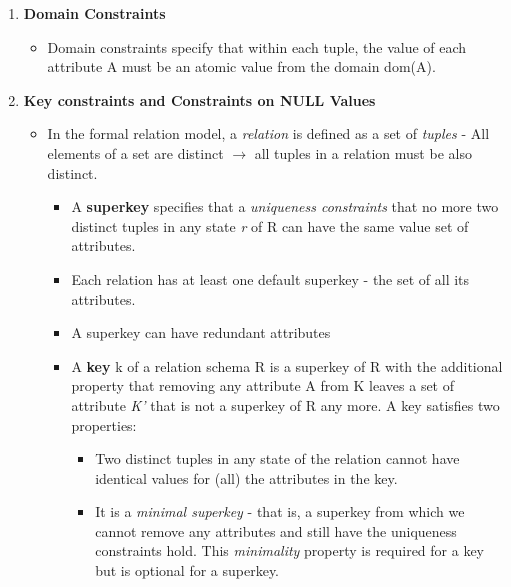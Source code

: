 \documentclass[10pt]{article}
\newcommand{\tf}{\textbf}
\newcommand{\ti}{\textit}
\begin{document}
\begin{enumerate}
	\item \tf{Domain Constraints}
	\begin{itemize}
		\item Domain constraints specify that within each tuple, the value of each attribute A must be an atomic value from the domain dom(A).
	\end{itemize}

	\item \tf{Key constraints and Constraints on NULL Values}
	\begin{itemize}
		\item In the formal relation model, a \ti{relation} is defined as a set of \ti{tuples} - All elements of a set are distinct $\rightarrow$ all tuples in a relation must be also distinct.
		\begin{itemize}
			\item A \tf{superkey} specifies that a \ti{uniqueness constraints} that no more two distinct tuples in any state \ti{r} of R can have the same value set of attributes.
			\item Each relation has at least one default superkey - the set of all its attributes.
			\item A superkey can have redundant attributes
			\item A \tf{key} k of a relation schema R is a superkey of R with the additional property that removing any attribute A from K leaves a set of attribute \ti{K'} that is not a superkey of R any more. A key satisfies two properties:
			\begin{itemize}
				\item Two distinct tuples in any state of the relation cannot have identical values for (all) the attributes in the key.
				\item It is a \ti{minimal superkey} - that is, a superkey from which we cannot remove any attributes and still have the uniqueness constraints hold. This \ti{minimality} property is required for a key but is optional for a superkey.
			\end{itemize}


\end{itemize}
\end{itemize}
\end{enumerate}
\end{document}
